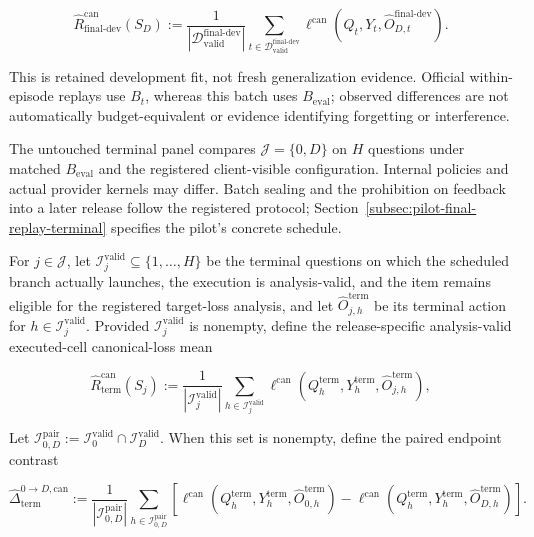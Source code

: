 \documentclass[10pt]{article} %
\providecommand{\1}{\mathbf{1}}  %
\theoremstyle{remark}
\theoremstyle{definition}
\begin{document}
\begin{equation}
\widehat R_{\mathrm{final\mbox{-}dev}}^{\mathrm{can}}(S_D)
:=
\frac{1}{|\mathcal D_{\mathrm{valid}}^{\mathrm{final\mbox{-}dev}}|}
\sum_{t\in\mathcal D_{\mathrm{valid}}^{\mathrm{final\mbox{-}dev}}}
\ell^{\mathrm{can}}\!\left(
Q_t,
Y_t,
\widehat O_{D,t}^{\mathrm{final\mbox{-}dev}}
\right).
\label{eq:regression-risk}
\end{equation}

This is retained development fit, not fresh generalization evidence.
Official within-episode replays use $B_t$, whereas this batch uses
$B_{\mathrm{eval}}$; observed differences are not automatically
budget-equivalent or evidence identifying forgetting or interference.

The untouched terminal panel compares $\mathcal J=\{0,D\}$ on $H$
questions under matched $B_{\mathrm{eval}}$ and the registered
client-visible configuration. Internal policies and actual provider
kernels may differ. Batch sealing and the prohibition on feedback into
a later release follow the registered protocol;
Section~\ref{subsec:pilot-final-replay-terminal} specifies the pilot's
concrete schedule.

For $j\in\mathcal J$, let $\mathcal I_{j}^{\mathrm{valid}}\subseteq\{1,\ldots,H\}$ be the terminal questions on which the scheduled branch actually launches, the execution is analysis-valid, and the item remains eligible for the registered target-loss analysis, and let $\widehat O_{j,h}^{\mathrm{term}}$ be its terminal action for $h\in\mathcal I_j^{\mathrm{valid}}$. Provided $\mathcal I_j^{\mathrm{valid}}$ is nonempty, define the release-specific analysis-valid executed-cell canonical-loss mean

\begin{equation}
\widehat R_{\mathrm{term}}^{\mathrm{can}}(S_j)
:=
\frac{1}{|\mathcal I_j^{\mathrm{valid}}|}
\sum_{h\in\mathcal I_j^{\mathrm{valid}}}
\ell^{\mathrm{can}}\!\left(
Q_h^{\mathrm{term}},
Y_h^{\mathrm{term}},
\widehat O_{j,h}^{\mathrm{term}}
\right),
\label{eq:terminal-risk}
\end{equation}

Let $\mathcal I_{0,D}^{\mathrm{pair}}:=\mathcal I_0^{\mathrm{valid}}\cap\mathcal I_D^{\mathrm{valid}}$. When this set is nonempty, define the paired endpoint contrast

\begin{equation}
\widehat\Delta_{\mathrm{term}}^{0\to D,\mathrm{can}}
:=
\frac{1}{|\mathcal I_{0,D}^{\mathrm{pair}}|}
\sum_{h\in\mathcal I_{0,D}^{\mathrm{pair}}}
\left[
\ell^{\mathrm{can}}\!\left(
Q_h^{\mathrm{term}},Y_h^{\mathrm{term}},
\widehat O_{0,h}^{\mathrm{term}}
\right)
-
\ell^{\mathrm{can}}\!\left(
Q_h^{\mathrm{term}},Y_h^{\mathrm{term}},
\widehat O_{D,h}^{\mathrm{term}}
\right)
\right].
\label{eq:terminal-paired-contrast}
\end{equation}
\end{document}
